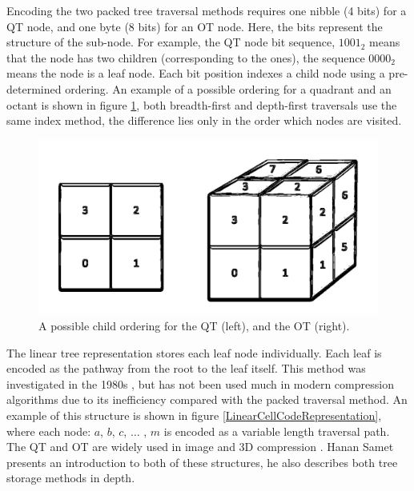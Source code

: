 Encoding the two packed tree traversal methods requires one nibble (4 bits) for a QT node, and one byte (8 bits) for an OT node. Here, the bits represent the structure of the sub-node. For example, the QT node bit sequence, $1001_2$ means that the node has two children (corresponding to the ones), the sequence $0000_2$ means the node is a leaf node. Each bit position indexes a child node using a pre-determined ordering. An example of a possible ordering for a quadrant and an octant is shown in figure \ref{ChildOrderExample}, both breadth-first and depth-first traversals use the same index method, the difference lies only in the order which nodes are visited. 

\begin{figure}[!htb]
\centering
\includegraphics[width=12cm]{images/ch2/ChildOrderExample}
\caption{A possible child ordering for the QT (left), and the OT (right).}
\label{ChildOrderExample}
\end{figure}

The linear tree representation stores each leaf node individually. Each leaf is encoded as the pathway from the root to the leaf itself. This method was investigated in the 1980s \cite{Gargantini82Effective,Yufei88Octcodes}, but has not been used much in modern compression algorithms due to its inefficiency compared with the packed traversal method. An example of this structure is shown in figure \ref{LinearCellCodeRepresentation}, where each node: $a$, $b$, $c$, $\dots$ , $m$  is encoded as a variable length traversal path. The QT and OT are widely used in image \cite{Varma12Application} and 3D compression \cite{Schnabel06Octree}. Hanan Samet \cite{Samet88Fund1} presents an introduction to both of these structures, he also describes both tree storage methods in depth. 

